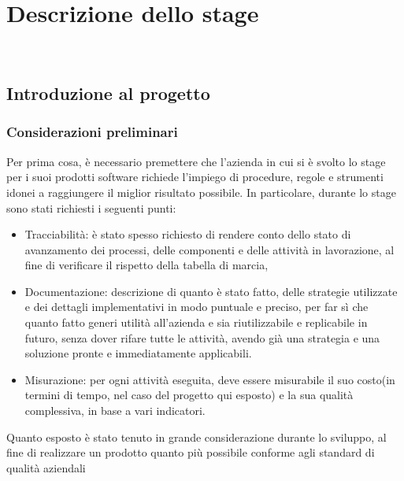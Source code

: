 
\chapter{Descrizione dello stage}
\label{cap:descrizione-stage}

\\

\section{Introduzione al progetto}
\subsection{Considerazioni preliminari}
Per prima cosa, è necessario premettere che l'azienda in cui si è svolto lo stage per i suoi prodotti software richiede l'impiego di procedure, regole e strumenti idonei a raggiungere il miglior risultato possibile.
In particolare, durante lo stage sono stati richiesti i seguenti punti:
\begin{itemize}
\item Tracciabilità: è stato spesso richiesto di rendere conto dello stato di avanzamento dei processi, delle componenti e delle attività in lavorazione, al fine di verificare il rispetto della tabella di marcia,
\item Documentazione: descrizione di quanto è stato fatto, delle strategie utilizzate e dei dettagli implementativi in modo puntuale e preciso, per far sì che quanto fatto generi utilità all'azienda e sia riutilizzabile e replicabile in futuro, senza dover rifare tutte le attività, avendo già una strategia e una soluzione pronte e immediatamente applicabili.
\item Misurazione: per ogni attività eseguita, deve essere misurabile il suo costo(in termini di tempo, nel caso del progetto qui esposto) e la sua qualità complessiva, in base a vari indicatori.
\end{itemize}
Quanto esposto è stato tenuto in grande considerazione durante lo sviluppo, al fine di realizzare un prodotto quanto più possibile conforme agli standard di qualità aziendali

